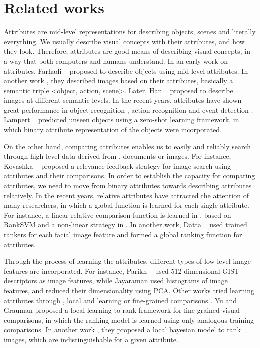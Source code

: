 

\section{Related works}


Attributes are mid-level representations for describing objects, scenes and literally everything. We usually describe visual concepts with their attributes, and how they look. Therefore, attributes are good means of describing visual concepts, in a way that both computers and humans understand. In an early work on attributes, Farhadi \etal~\cite{Farhadi09describingobjects} proposed to describe objects using mid-level attributes. In another work \cite{farhadi10}, they described images based on their attributes, basically a semantic triple <object, action, scene>. Later, Han \etal~\cite{6739133} proposed to describe images at different semantic levels. In the recent years, attributes have shown great performance in object recognition \cite{Farhadi09describingobjects,7298613}, action recognition \cite{6838985,5995353} and event detection \cite{6475038}. Lampert \etal~\cite{6571196} predicted unseen objects using a zero-shot learning framework, in which binary attribute representation of the objects were incorporated. 

On the other hand, comparing attributes enables us to easily and reliably search through high-level data derived from \eg, documents or images. For instance, Kovashka \etal~\cite{KovashkaG13} proposed a relevance feedback strategy for image search using attributes and their comparisons. In order to establish the capacity for comparing attributes, we need to move from binary attributes towards describing attributes relatively. In the recent years, relative attributes have attracted the attention of many researchers, in which a global function is learned for each single attribute. For instance, a linear relative comparison function is learned in \cite{parikh2011}, based on RankSVM \cite{Joachims2002} and a non-linear strategy in \cite{Li2013}. In another work, Datta \etal~\cite{5771429} used trained rankers for each facial image feature and formed a global ranking function for attributes.

Through the process of learning the attributes, different types of low-level image features are incorporated. For instance, Parikh \etal~\cite{parikh2011} used 512-dimensional GIST \cite{Aude01} descriptors as image features, while Jayaraman \etal\cite{6909607} used histograms of image features, and reduced their dimensionality using PCA. Other works tried learning attributes through \eg, local and learning \cite{1641014} or fine-grained comparisons \cite{Yu2014}. Yu and Grauman \cite{Yu2014} proposed a local learning-to-rank framework for fine-grained visual comparisons, in which the ranking model is learned using only analogous training comparisons. In another work \cite{Yu2015}, they proposed a local bayesian model to rank images, which are indistinguishable for a given attribute. 

